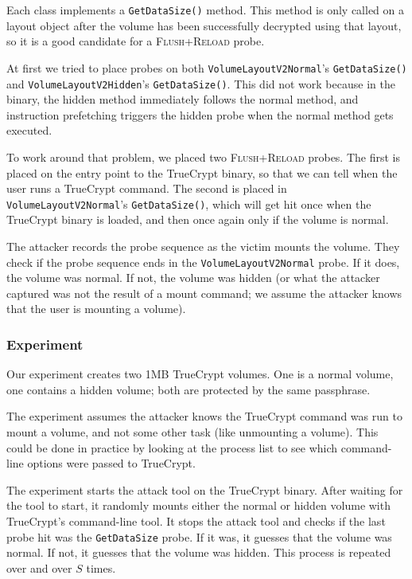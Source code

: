 \documentclass[letterpaper,twocolumn,10pt]{article}
\begin{document}
Each class implements a \texttt{GetDataSize()} method. This method is only
called on a layout object after the volume has been successfully decrypted using
that layout, so it is a good candidate for a \textsc{Flush+Reload} probe.

At first we tried to place probes on both \texttt{VolumeLayoutV2Normal}'s
\texttt{GetDataSize()} and \texttt{VolumeLayoutV2Hidden}'s
\texttt{GetDataSize()}. This did not work because in the binary, the hidden
method immediately follows the normal method, and instruction prefetching
triggers the hidden probe when the normal method gets executed.

To work around that problem, we placed two \textsc{Flush+Reload} probes. The
first is placed on the entry point to the TrueCrypt binary, so that we can tell
when the user runs a TrueCrypt command. The second is placed in
\texttt{VolumeLayoutV2Normal}'s \texttt{GetDataSize()}, which will get hit once
when the TrueCrypt binary is loaded, and then once again only if the volume is
normal.

The attacker records the probe sequence as the victim mounts the volume. They
check if the probe sequence ends in the \texttt{VolumeLayoutV2Normal} probe. If
it does, the volume was normal. If not, the volume was hidden (or what the
attacker captured was not the result of a mount command; we assume the attacker
knows that the user is mounting a volume).

\subsubsection{Experiment}

Our experiment creates two 1MB TrueCrypt volumes. One is a normal volume, one
contains a hidden volume; both are protected by the same passphrase.

The experiment assumes the attacker knows the TrueCrypt command was run to mount
a volume, and not some other task (like unmounting a volume). This could be done
in practice by looking at the process list to see which command-line options
were passed to TrueCrypt.

The experiment starts the attack tool on the TrueCrypt binary. After waiting for
the tool to start, it randomly mounts either the normal or hidden volume with
TrueCrypt's command-line tool. It stops the attack tool and checks if the last
probe hit was the \texttt{GetDataSize} probe. If it was, it guesses that the
volume was normal. If not, it guesses that the volume was hidden. This process
is repeated over and over $S$ times.
\end{document}
